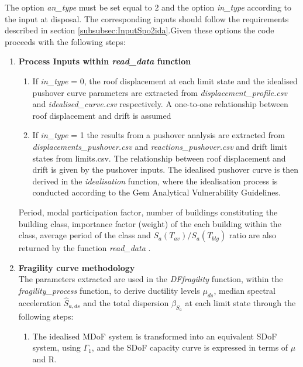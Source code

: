 The option \textit{an\_type} must be set equal to 2 and the option \textit{in\_type} according to the input at disposal. The corresponding inputs should follow the requirements described in section \ref{subsubsec:InputSpo2ida}.Given these options the code proceeds with the following steps:\\

\begin{enumerate}
\item \textbf{Process Inputs within \textit{read\_data}  function}\\

\begin{enumerate}
\item If \textit{in\_type} = 0, the roof displacement at each limit state and the idealised pushover curve parameters are extracted from \textit{displacement\_profile.csv} and \textit{idealised\_curve.csv} respectively. A one-to-one relationship between roof displacement and drift is assumed
\item If \textit{in\_type} = 1 the results from a pushover analysis are extracted from \textit{displacements\_pushover.csv} and \textit{reactions\_pushover.csv} and drift limit states from {limits.csv}. The relationship between roof displacement and drift is given by the pushover inputs. The idealised pushover curve is then derived in the \textit{idealisation} function, where the idealisation process is conducted according to the Gem Analytical Vulnerability Guidelines.\\
\end{enumerate}

Period, modal participation factor, number of buildings constituting the building class, importance factor (weight) of the each building within the class, average period of the class and $S_a(T_{av})/S_a(T_{blg})$ ratio are also returned by the function \textit{read\_data} .\\

\item \textbf{Fragility curve methodology}\\
The parameters extracted are used in the \textit{DF\-fragility} function, within the \textit{fragility\_process} function, to derive ductility levels $\mu_{ds}$, median spectral acceleration $\hat{S}_{a,ds}$ and the total dispersion $\beta_{S_a}$ at each limit state through the following steps:

\begin{enumerate}

\item The idealised MDoF system is transformed into an equivalent SDoF system, using $\Gamma_1$, and the SDoF capacity curve is expressed in terms of $\mu$ and R.


\end{enumerate}
\end{enumerate}

